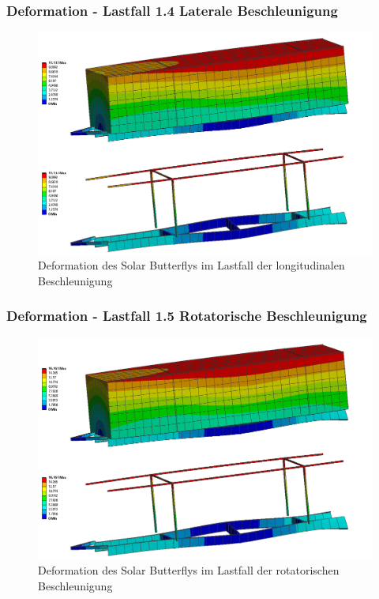 \subsubsection{Deformation - Lastfall 1.4 Laterale Beschleunigung}
\begin{figure}[H]
  \centering
  \includegraphics[width=1\linewidth]{04_figures/FEM 1.4.png}
  \caption{Deformation des Solar Butterflys im Lastfall der longitudinalen Beschleunigung}
  \label{FEM 1.4}
\end{figure}

\subsubsection{Deformation - Lastfall 1.5 Rotatorische Beschleunigung}
\begin{figure}[H]
  \centering
  \includegraphics[width=1\linewidth]{04_figures/FEM 1.5.png}
  \caption{Deformation des Solar Butterflys im Lastfall der rotatorischen Beschleunigung}
  \label{FEM 1.5}
\end{figure}
\newpage
